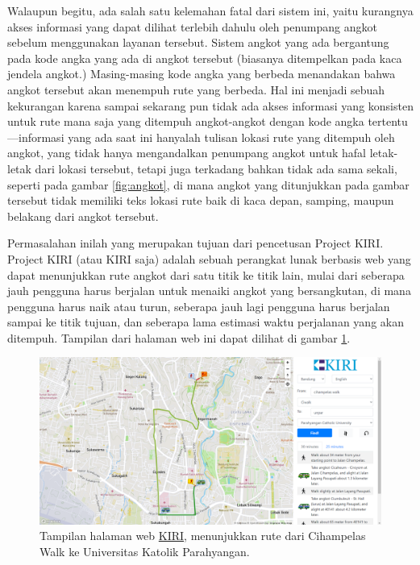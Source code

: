 \documentclass[a4paper,twoside]{article}
\begin{document}
Walaupun begitu, ada salah satu kelemahan fatal dari sistem ini, yaitu kurangnya akses informasi yang dapat dilihat terlebih dahulu oleh penumpang angkot sebelum menggunakan layanan tersebut. Sistem angkot yang ada bergantung pada kode angka yang ada di angkot tersebut (biasanya ditempelkan pada kaca jendela angkot.) Masing-masing kode angka yang berbeda menandakan bahwa angkot tersebut akan menempuh rute yang berbeda. Hal ini menjadi sebuah kekurangan karena sampai sekarang pun tidak ada akses informasi yang konsisten untuk rute mana saja yang ditempuh angkot-angkot dengan kode angka tertentu---informasi yang ada saat ini hanyalah tulisan lokasi rute yang ditempuh oleh angkot, yang tidak hanya mengandalkan penumpang angkot untuk hafal letak-letak dari lokasi tersebut, tetapi juga terkadang bahkan tidak ada sama sekali, seperti pada gambar \ref{fig:angkot}, di mana angkot yang ditunjukkan pada gambar tersebut tidak memiliki teks lokasi rute baik di kaca depan, samping, maupun belakang dari angkot tersebut.

Permasalahan inilah yang merupakan tujuan dari pencetusan Project KIRI. Project KIRI (atau KIRI saja) adalah sebuah perangkat lunak berbasis web yang dapat menunjukkan rute angkot dari satu titik ke titik lain, mulai dari seberapa jauh pengguna harus berjalan untuk menaiki angkot yang bersangkutan, di mana pengguna harus naik atau turun, seberapa jauh lagi pengguna harus berjalan sampai ke titik tujuan, dan seberapa lama estimasi waktu perjalanan yang akan ditempuh. Tampilan dari halaman web ini dapat dilihat di gambar \ref{fig:kiripage}.

\begin{figure}[h]
	\centering
	\includegraphics[width=\textwidth]{projectkiri}
	\caption[Tampilan halaman web KIRI]{Tampilan halaman web \href{https://projectkiri.id}{KIRI}, menunjukkan rute dari Cihampelas Walk ke Universitas Katolik Parahyangan.}
	\label{fig:kiripage}
\end{figure}
\end{document}
